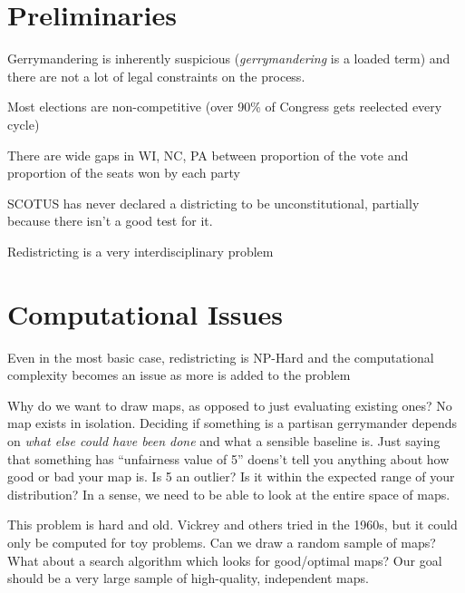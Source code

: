 



\section*{Preliminaries}

Gerrymandering is inherently suspicious (\textit{gerrymandering} is a loaded term) and there are not a lot of legal constraints on the process.

Most elections are non-competitive (over 90\% of Congress gets reelected every cycle)

There are wide gaps in WI, NC, PA between proportion of the vote and proportion of the seats won by each party

SCOTUS has never declared a districting to be unconstitutional, partially because there isn't a good test for it.

Redistricting is a very interdisciplinary problem

\section*{Computational Issues}

Even in the most basic case, redistricting is NP-Hard and the computational complexity becomes an issue as more is added to the problem

Why do we want to draw maps, as opposed to just evaluating existing ones?  No map exists in isolation.  Deciding if something is a partisan gerrymander depends on \textit{what else could have been done} and what a sensible baseline is.  Just saying that something has ``unfairness value of 5'' doens't tell you anything about how good or bad your map is.  Is 5 an outlier? Is it within the expected range of your distribution?  In a sense, we need to be able to look at the entire space of maps.

This problem is hard and old.  Vickrey and others tried in the 1960s, but it could only be computed for toy problems.  Can we draw a random sample of maps?  What about a search algorithm which looks for good/optimal maps?  Our goal should be a very large sample of high-quality, independent maps.  

